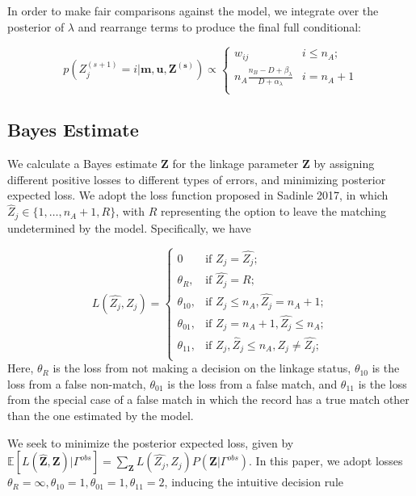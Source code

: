 \documentclass[12pt,letterpaper]{article}
\newcommand{\1}[1]{\mathbb{I}\!\left[#1\right]} %
\begin{document}
{In order to make fair comparisons against the \citep{sadinle_bayesian_2017} model, we
integrate over the posterior of \(\lambda\) and rearrange terms to
produce the final full conditional:

\[p\left(Z_j^{(s+1)}  = i| \mathbf{m}, \mathbf{u}, \mathbf{Z^{(s)}}\right) \propto
\begin{cases} 
	w_{ij}  & i \leq n_A; \\
	n_A \frac{n_B - D + \beta_{\lambda}}{D + \alpha_{\lambda}} & i  = n_A + 1 \\
\end{cases}\]

\hypertarget{bayes-estimate}{%
	\subsection{Bayes Estimate}
	\label{bayes-estimate}}

We calculate a Bayes estimate \(\hat{\mathbf{Z}}\) for the linkage
parameter \(\mathbf{Z}\) by assigning different positive losses to
different types of errors, and minimizing posterior expected loss. We
adopt the loss function proposed in Sadinle 2017, in which
\(\hat{Z}_j \in \{1, \ldots, n_A + 1, R\}\), with \(R\) representing the
option to leave the matching undetermined by the model. Specifically, we have

\[L(\hat{Z_j}, Z_j)=\begin{cases} 
	0  & \text{if } Z_j = \hat{Z_j}; \\
	\theta_R,  & \text{if } \hat{Z_j} = R; \\
	\theta_{10},  & \text{if } Z_j \leq n_A,\hat{Z_j} = n_A + 1 ; \\
	\theta_{01},  & \text{if } Z_j = n_A + 1,\hat{Z_j} \leq n_A ; \\
	\theta_{11},  & \text{if } Z_j, \hat{Z}_j \leq n_A, Z_j \neq \hat{Z_j} ; \\
\end{cases}\] Here, \(\theta_R\) is the loss from not making a decision
on the linkage status, \(\theta_{10}\) is the loss from a false
non-match, \(\theta_{01}\) is the loss from a false match, and
\(\theta_{11}\) is the loss from the special case of a false match in
which the record has a true match other than the one estimated by the
model. 

We seek to minimize the posterior expected loss, given by $\mathbb{E}[L(\hat{\mathbf{Z}}, \mathbf{Z})|\Gamma^{obs}] = \sum_{\mathbf{Z}} L(\hat{Z_j}, Z_j)P(\mathbf{Z}|\Gamma^{obs})$. In this paper, we adopt losses
\(\theta_R = \infty, \theta_{10} = 1, \theta_{01} = 1, \theta_{11} = 2\), inducing the intuitive decision rule

}
\end{document}
